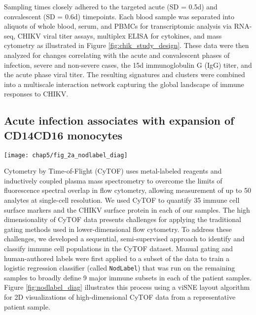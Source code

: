 Sampling times closely adhered to the targeted acute (SD = 0.5d) and convalescent (SD = 0.6d) timepoints. Each blood sample was separated into aliquots of whole blood, serum, and PBMCs for transcriptomic analysis via RNA-seq, CHIKV viral titer assays, multiplex ELISA for cytokines, and mass cytometry as illustrated in Figure \ref{fig:chik_study_design}. These data were then analyzed for changes correlating with the acute and convalescent phases of infection, severe and non-severe cases, the 15d immunoglobulin G (IgG) titer, and the acute phase viral titer. The resulting signatures and clusters were combined into a multiscale interaction network capturing the global landscape of immune responses to CHIKV.

\subsection{Acute infection associates with expansion of CD14\sups{+}\allowbreak CD16\sups{+} monocytes}

\begin{figure*}[htb]
  \texttt{[image: chap5/fig\_2a\_nodlabel\_diag]}
  \caption[Overview of the NodLabel procedure]{\textbf{Overview of the NodLabel procedure}, using a viSNE layout of CyTOF single-cell events. Left side, point color indicates channel values for four example channels. Right side, traditional hierarchical gating was used on a subset of samples to identify 8 major immune compartments, which was then used to train a logistic regression classifier (Nod) that applied labels for canonical leukocyte phenotypes to all samples (NodLabel).
  }
  \label{fig:nodlabel_diag}
\end{figure*}

Cytometry by Time-of-Flight (CyTOF) uses metal-labeled reagents and inductively coupled plasma mass spectrometry to overcome the limits of fluorescence spectral overlap in flow cytometry, allowing measurement of up to 50 analytes at single-cell resolution. We used CyTOF to quantify 35 immune cell surface markers and the CHIKV surface protein in each of our samples. The high dimensionality of CyTOF data presents challenges for applying the traditional gating methods used in lower-dimensional flow cytometry. To address these challenges, we developed a sequential, semi-supervised approach to identify and classify immune cell populations in the CyTOF dataset. Manual gating and human-authored labels were first applied to a subset of the data to train a logistic regression classifier (called \texttt{NodLabel}) that was run on the remaining samples to broadly define 9 major immune subsets in each of the patient samples. Figure \ref{fig:nodlabel_diag} illustrates this process using a viSNE layout algorithm\autocite{Amir2013} for 2D visualizations of high-dimensional CyTOF data from a representative patient sample.

